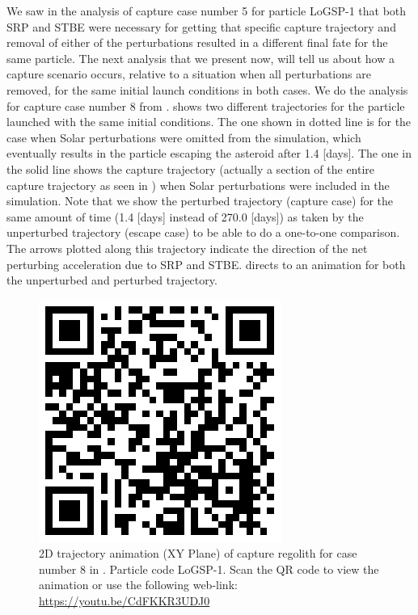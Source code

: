 We saw in the analysis of capture case number 5 for particle LoGSP-1 that both \gls{SRP} and \gls{STBE} were necessary for getting that specific capture trajectory and removal of either of the perturbations resulted in a different final fate for the same particle. The next analysis that we present now, will tell us about how a capture scenario occurs, relative to a situation when all perturbations are removed, for the same initial launch conditions in both cases. We do the analysis for capture case number 8 from .  shows two different trajectories for the particle launched with the same initial conditions. The one shown in dotted line is for the case when Solar perturbations were omitted from the simulation, which eventually results in the particle escaping the asteroid after 1.4 [days]. The one in the solid line shows the capture trajectory (actually a section of the entire capture trajectory as seen in ) when Solar perturbations were included in the simulation. Note that we show the perturbed trajectory (capture case) for the same amount of time (1.4 [days] instead of 270.0 [days]) as taken by the unperturbed trajectory (escape case) to be able to do a one-to-one comparison. The arrows plotted along this trajectory indicate the direction of the net perturbing acceleration due to \gls{SRP} and \gls{STBE}.  directs to an animation for both the unperturbed and perturbed trajectory.
\begin{figure}[htb]
\centering
\captionsetup{justification=centering}
\includegraphics[scale=0.25]{longest_edge_perturbations/3.2Density_1cmSize/qrcode_comparative_8ms_165Azimuth_45SolarPhase.png}
\caption{2D trajectory animation (XY Plane) of capture regolith for case number 8 in . Particle code LoGSP-1. Scan the QR code to view the animation or use the following web-link: \url{https://youtu.be/CdFKKR3UDJ0}}
\label{fig:LoGSP_1_capture_case_8_2d_trajectory_comparative_animation}
\end{figure}
